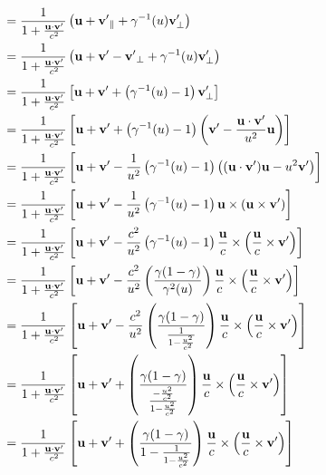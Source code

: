\documentclass[12pt,a4]{article}
\begin{document}
\begin{enumerate}
\begin{enumerate}
\begin{align*}
                  &= \frac{1}{1 + \frac{{\bf u} \cdot {\bf v}'}{c^2}} \left( {\bf u} + {\bf v'}_\parallel + \gamma^{-1}(  u) {\bf v}'_\perp\right)\\
                  &= \frac{1}{1 + \frac{{\bf u} \cdot {\bf v}'}{c^2}} \left( {\bf u} + {\bf v'} - {\bf v'}_\perp + \gamma^{-1}(  u) {\bf v}'_\perp\right)\\
                  &= \frac{1}{1 + \frac{{\bf u} \cdot {\bf v}'}{c^2}} \left[ {\bf u} + {\bf v'} + \left(\gamma^{-1}(  u) - 1\right) {\bf v}'_\perp\right]\\
                  &= \frac{1}{1 + \frac{{\bf u} \cdot {\bf v}'}{c^2}} \left[ {\bf u} + {\bf v'} + \left(\gamma^{-1}(  u) - 1\right) \left({\bf v}' - \frac{{\bf u}\cdot{\bf v}'}{u^2} {\bf u}\right)\right]\\
                  &= \frac{1}{1 + \frac{{\bf u} \cdot {\bf v}'}{c^2}} \left[ {\bf u} + {\bf v'} - \frac{1}{u^2}\left(\gamma^{-1}(  u) - 1\right) \left(({\bf u}\cdot{\bf v}'){\bf u} - u^2{\bf v}'\right)\right]\\
                  &= \frac{1}{1 + \frac{{\bf u} \cdot {\bf v}'}{c^2}} \left[ {\bf u} + {\bf v'} - \frac{1}{u^2}\left(\gamma^{-1}(  u) - 1\right) {\bf u} \times \left({\bf u} \times {\bf v}'\right)\right]\\
                  &= \frac{1}{1 + \frac{{\bf u} \cdot {\bf v}'}{c^2}} \left[ {\bf u} + {\bf v'} - \frac{c^2}{u^2}\left(\gamma^{-1}(  u) - 1\right) \frac{\bf u}{c} \times \left(\frac{\bf u}{c} \times {\bf v}'\right)\right]\\
                  &= \frac{1}{1 + \frac{{\bf u} \cdot {\bf v}'}{c^2}} \left[ {\bf u} + {\bf v'} - \frac{c^2}{u^2}\left(\frac{\gamma (1 - \gamma)}{\gamma^{2}( u)} \right) \frac{\bf u}{c} \times \left(\frac{\bf u}{c} \times {\bf v}'\right)\right]\\
                  &= \frac{1}{1 + \frac{{\bf u} \cdot {\bf v}'}{c^2}} \left[ {\bf u} + {\bf v'} - \frac{c^2}{u^2}\left(\frac{\gamma (1 - \gamma)}{\frac{1}{1 - \frac{u^2}{c^2}}} \right) \frac{\bf u}{c} \times \left(\frac{\bf u}{c} \times {\bf v}'\right)\right]\\
                  &= \frac{1}{1 + \frac{{\bf u} \cdot {\bf v}'}{c^2}} \left[ {\bf u} + {\bf v'} + \left(\frac{\gamma (1 - \gamma)}{\frac{-\frac{u^2}{c^2}}{1 - \frac{u^2}{c^2}}} \right) \frac{\bf u}{c} \times \left(\frac{\bf u}{c} \times {\bf v}'\right)\right]\\
                  &= \frac{1}{1 + \frac{{\bf u} \cdot {\bf v}'}{c^2}} \left[ {\bf u} + {\bf v'} + \left(\frac{\gamma (1 - \gamma)}{ 1 - \frac{1}{1 - \frac{u^2}{c^2}}} \right) \frac{\bf u}{c} \times \left(\frac{\bf u}{c} \times {\bf v}'\right)\right]\\

\end{align*}
\end{enumerate}
\end{enumerate}
\end{document}
